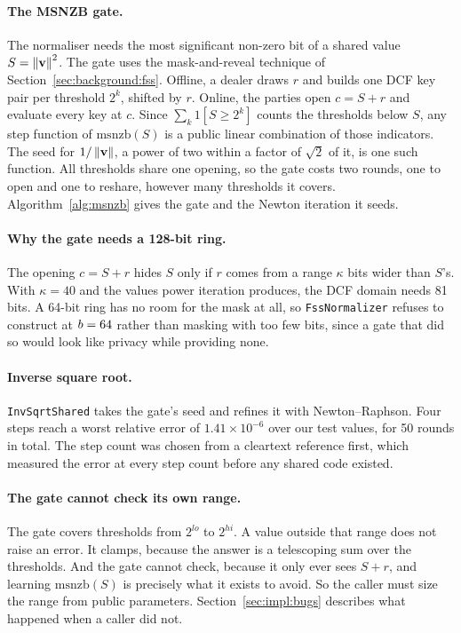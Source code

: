 \paragraph{The MSNZB gate.} The normaliser needs the most significant non-zero
bit of a shared value $S = \left\lVert\mathbf{v}\right\rVert^2$. The gate uses the
mask-and-reveal technique of Section~\ref{sec:background:fss}. Offline, a dealer
draws $r$ and builds one DCF key pair per threshold $2^k$, shifted by $r$. Online,
the parties open $c = S + r$ and evaluate every key at $c$. Since
$\sum_k 1[S \ge 2^k]$ counts the thresholds below $S$, any step function of
$\mathrm{msnzb}(S)$ is a public linear combination of those indicators. The seed
for $1/\left\lVert\mathbf{v}\right\rVert$, a power of two within a factor of $\sqrt{2}$ of it, is
one such function. All
thresholds share one opening, so the gate costs two rounds, one to open and one to
reshare, however many thresholds it covers. Algorithm~\ref{alg:msnzb} gives the
gate and the Newton iteration it seeds.

\paragraph{Why the gate needs a 128-bit ring.} The opening $c = S + r$ hides $S$
only if $r$ comes from a range $\kappa$ bits wider than $S$'s. With $\kappa = 40$
and the values power iteration produces, the DCF domain needs 81 bits. A 64-bit
ring has no room for the mask at all, so \texttt{FssNormalizer} refuses to
construct at $b = 64$ rather than masking with too few bits, since a gate that
did so would look like privacy while providing none.

\paragraph{Inverse square root.} \texttt{InvSqrtShared} takes the gate's seed and
refines it with Newton--Raphson. Four steps reach a worst relative error of $1.41
\times 10^{-6}$ over our test values, for 50 rounds in total. The step count was
chosen from a cleartext reference first, which measured the error at every step
count before any shared code existed.

\paragraph{The gate cannot check its own range.} The gate covers thresholds from
$2^{\mathit{lo}}$ to $2^{\mathit{hi}}$. A value outside that range does not raise
an error. It clamps, because the answer is a telescoping sum over the thresholds.
And the gate cannot check, because it only ever sees $S + r$, and learning
$\mathrm{msnzb}(S)$ is precisely what it exists to avoid. So the caller must size
the range from public parameters. Section~\ref{sec:impl:bugs} describes what
happened when a caller did not.

